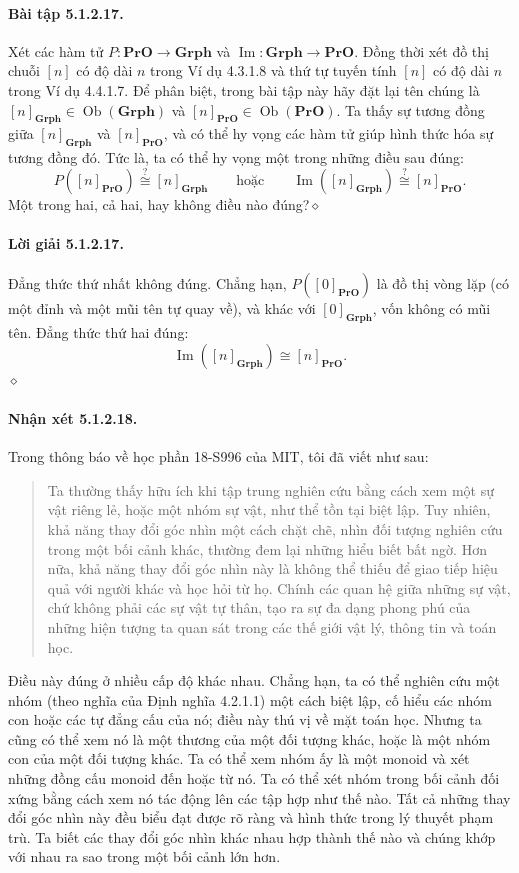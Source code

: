 \paragraph{Bài tập 5.1.2.17.} Xét các hàm tử $P:\mathbf{PrO}\to\mathbf{Grph}$ và $\operatorname{Im}:\mathbf{Grph}\to\mathbf{PrO}$. Đồng thời xét đồ thị chuỗi $[n]$ có độ dài $n$ trong Ví dụ 4.3.1.8 và thứ tự tuyến tính $[n]$ có độ dài $n$ trong Ví dụ 4.4.1.7. Để phân biệt, trong bài tập này hãy đặt lại tên chúng là $[n]_{\mathbf{Grph}}\in\operatorname{Ob}(\mathbf{Grph})$ và $[n]_{\mathbf{PrO}}\in\operatorname{Ob}(\mathbf{PrO})$. Ta thấy sự tương đồng giữa $[n]_{\mathbf{Grph}}$ và $[n]_{\mathbf{PrO}}$, và có thể hy vọng các hàm tử giúp hình thức hóa sự tương đồng đó. Tức là, ta có thể hy vọng một trong những điều sau đúng:
\[P([n]_{\mathbf{PrO}})\overset{?}{\cong}[n]_{\mathbf{Grph}}\qquad\text{hoặc}\qquad\operatorname{Im}([n]_{\mathbf{Grph}})\overset{?}{\cong}[n]_{\mathbf{PrO}}.\]
Một trong hai, cả hai, hay không điều nào đúng?\hfill$\diamond$
\paragraph{Lời giải 5.1.2.17.} Đẳng thức thứ nhất không đúng. Chẳng hạn, $P([0]_{\mathbf{PrO}})$ là đồ thị vòng lặp (có một đỉnh và một mũi tên tự quay về), và khác với $[0]_{\mathbf{Grph}}$, vốn không có mũi tên. Đẳng thức thứ hai đúng:
\[\operatorname{Im}([n]_{\mathbf{Grph}})\cong[n]_{\mathbf{PrO}}.\]\hfill$\diamond$
\paragraph{Nhận xét 5.1.2.18.} Trong thông báo về học phần 18-S996 của MIT, tôi đã viết như sau:
\begin{quote}
Ta thường thấy hữu ích khi tập trung nghiên cứu bằng cách xem một sự vật riêng lẻ, hoặc một nhóm sự vật, như thể tồn tại biệt lập. Tuy nhiên, khả năng thay đổi góc nhìn một cách chặt chẽ, nhìn đối tượng nghiên cứu trong một bối cảnh khác, thường đem lại những hiểu biết bất ngờ. Hơn nữa, khả năng thay đổi góc nhìn này là không thể thiếu để giao tiếp hiệu quả với người khác và học hỏi
từ họ. Chính các quan hệ giữa những sự vật, chứ không phải các sự vật tự thân, tạo ra sự đa dạng phong phú của những hiện tượng ta quan sát trong các thế giới vật lý, thông tin và toán học.
\end{quote}
Điều này đúng ở nhiều cấp độ khác nhau. Chẳng hạn, ta có thể nghiên cứu một nhóm (theo nghĩa của Định nghĩa 4.2.1.1) một cách biệt lập, cố hiểu các nhóm con hoặc các tự đẳng cấu của nó; điều này thú vị về mặt toán học. Nhưng ta cũng có thể xem nó là một thương của một đối tượng khác, hoặc là một nhóm con của một đối tượng khác. Ta có thể xem nhóm ấy là một monoid và xét những đồng cấu monoid đến hoặc từ nó. Ta có thể xét nhóm trong bối cảnh đối xứng bằng cách xem nó tác động lên các tập hợp như thế nào. Tất cả những thay đổi góc nhìn này đều biểu đạt được rõ ràng và hình thức trong lý thuyết phạm trù. Ta biết các thay đổi góc nhìn khác nhau hợp thành thế nào và chúng khớp với nhau ra sao trong một bối cảnh lớn hơn.
